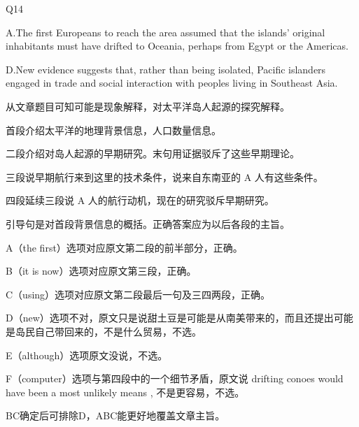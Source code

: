 \begin{blk}
    \begin{qst}
        Q14
    \end{qst}

    \begin{chc}
        A.The first Europeans to reach the area assumed that the islands’ original inhabitants must have drifted to Oceania, perhaps from Egypt or the Americas.

        D.New evidence suggests that, rather than being isolated, Pacific islanders engaged in trade and social interaction with peoples living in Southeast Asia.
    \end{chc}

    \begin{nlz}
        从文章题目可知可能是现象解释，对太平洋岛人起源的探究解释。

        首段介绍太平洋的地理背景信息，人口数量信息。

        二段介绍对岛人起源的早期研究。末句用证据驳斥了这些早期理论。

        三段说早期航行来到这里的技术条件，说来自东南亚的 A 人有这些条件。

        四段延续三段说 A 人的航行动机，现在的研究驳斥早期研究。

        引导句是对首段背景信息的概括。正确答案应为以后各段的主旨。

        A（the first）选项对应原文第二段的前半部分，正确。

        B（it is now）选项对应原文第三段，正确。

        C（using）选项对应原文第二段最后一句及三四两段，正确。

        D（new）选项不对，原文只是说甜土豆是可能是从南美带来的，而且还提出可能是岛民自己带回来的，不是什么贸易，不选。

        E（although）选项原文没说，不选。

        F（computer）选项与第四段中的一个细节矛盾，原文说 drifting conoes would have been a most unlikely means , 不是更容易，不选。

        BC确定后可排除D，ABC能更好地覆盖文章主旨。
    \end{nlz}
\end{blk}
